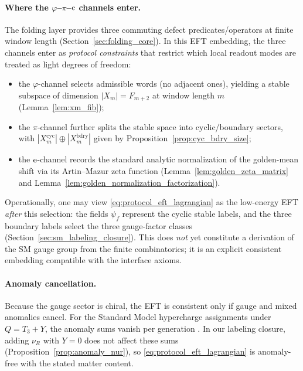 \paragraph{Where the \texorpdfstring{$\varphi$--$\pi$--$\mathrm{e}$}{phi--pi--e} channels enter.}
The folding layer provides three commuting defect predicates/operators at finite window length (Section~\ref{sec:folding_core}).
In this EFT embedding, the three channels enter as \emph{protocol constraints} that restrict which local readout modes are treated as light degrees of freedom:
\begin{itemize}
\item the $\varphi$-channel selects admissible words (no adjacent ones), yielding a stable subspace of dimension $|X_m|=F_{m+2}$ at window length $m$ (Lemma~\ref{lem:xm_fib});
\item the $\pi$-channel further splits the stable space into cyclic/boundary sectors, with $|X_m^{\mathrm{cyc}}|\oplus |X_m^{\mathrm{bdry}}|$ given by Proposition~\ref{prop:cyc_bdry_size};
\item the $\mathrm{e}$-channel records the standard analytic normalization of the golden-mean shift via its Artin--Mazur zeta function (Lemma~\ref{lem:golden_zeta_matrix} and Lemma~\ref{lem:golden_normalization_factorization}).
\end{itemize}
Operationally, one may view \eqref{eq:protocol_eft_lagrangian} as the low-energy EFT \emph{after} this selection: the fields $\psi_f$ represent the cyclic stable labels, and the three boundary labels select the three gauge-factor classes (Section~\ref{sec:sm_labeling_closure}).
This does \emph{not} yet constitute a derivation of the SM gauge group from the finite combinatorics; it is an explicit consistent embedding compatible with the interface axioms.

\paragraph{Anomaly cancellation.}
Because the gauge sector is chiral, the EFT is consistent only if gauge and mixed anomalies cancel.
For the Standard Model hypercharge assignments under $Q=T_3+Y$, the anomaly sums vanish per generation \cite{BouchiatIliopoulosMeyer1972,PeskinSchroeder1995,PDGRPP2024}.
In our labeling closure, adding $\nu_R$ with $Y=0$ does not affect these sums (Proposition~\ref{prop:anomaly_nur}), so \eqref{eq:protocol_eft_lagrangian} is anomaly-free with the stated matter content.

